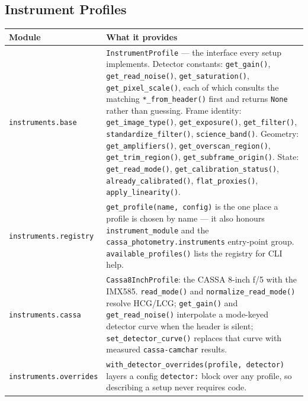 \documentclass[11pt,a4paper]{article}
\begin{document}
\subsection{Instrument Profiles}
\begin{center}
\begin{longtable}{|p{3.6cm}|p{10.9cm}|}
\hline
\textbf{Module} & \textbf{What it provides} \\
\hline
\endhead
\texttt{instruments.base} & \texttt{InstrumentProfile} --- the interface every setup implements. Detector constants: \texttt{get\_gain()}, \texttt{get\_read\_noise()}, \texttt{get\_saturation()}, \texttt{get\_pixel\_scale()}, each of which consults the matching \texttt{*\_from\_header()} first and returns \texttt{None} rather than guessing. Frame identity: \texttt{get\_image\_type()}, \texttt{get\_exposure()}, \texttt{get\_filter()}, \texttt{standardize\_filter()}, \texttt{science\_band()}. Geometry: \texttt{get\_amplifiers()}, \texttt{get\_overscan\_region()}, \texttt{get\_trim\_region()}, \texttt{get\_subframe\_origin()}. State: \texttt{get\_read\_mode()}, \texttt{get\_calibration\_status()}, \texttt{already\_calibrated()}, \texttt{flat\_proxies()}, \texttt{apply\_linearity()}. \\
\hline
\texttt{instruments.registry} & \texttt{get\_profile(name, config)} is the one place a profile is chosen by name --- it also honours \texttt{instrument\_module} and the \texttt{cassa\_photometry.instruments} entry-point group. \texttt{available\_profiles()} lists the registry for CLI help. \\
\hline
\texttt{instruments.cassa} & \texttt{Cassa8InchProfile}: the CASSA 8-inch f/5 with the IMX585. \texttt{read\_mode()} and \texttt{normalize\_read\_mode()} resolve HCG/LCG; \texttt{get\_gain()} and \texttt{get\_read\_noise()} interpolate a mode-keyed detector curve when the header is silent; \texttt{set\_detector\_curve()} replaces that curve with measured \texttt{cassa-camchar} results. \\
\hline
\texttt{instruments.overrides} & \texttt{with\_detector\_overrides(profile, detector)} layers a config \texttt{detector:} block over any profile, so describing a setup never requires code. \\
\hline
\end{longtable}
\end{center}
\end{document}
